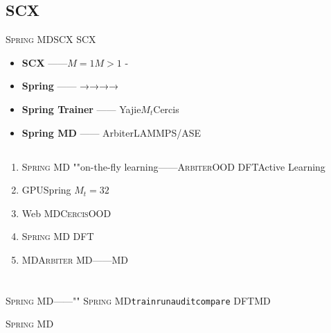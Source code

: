\documentclass[12pt,a4paper]{article}
\theoremstyle{remark}
\newcommand{\Cercis}{\textsc{Cercis}}
\newcommand{\Arbiter}{\textsc{Arbiter}}
\newcommand{\SpringMD}{\textsc{Spring MD}}
\begin{document}
\subsection{SCX}

\SpringMD{}SCX\cite{scx_ml_audit,scx_hamiltonian,yajie_protocol,scx_spring_trainer,scx_spring_framework}
SCX

\begin{itemize}[itemsep=3pt]
    \item \textbf{SCX} ——$M=1$$M>1$
    -
    \item \textbf{Spring\cite{scx_spring_framework}} ——
    →→→→
    \item \textbf{Spring Trainer\cite{scx_spring_trainer}} ——
    Yajie$M_t$Cercis
    \item \textbf{Spring MD} ——
    ArbiterLAMMPS/ASE
\end{itemize}

\subsection{}

\begin{enumerate}[label=(\arabic*),itemsep=3pt]
    \item \textbf{} \SpringMD{}
    ""on-the-fly learning——\Arbiter{}OOD
    DFTActive Learning

    \item \textbf{} GPUSpring
    $M_t=32$

    \item \textbf{} Web
    MD\Cercis{}OOD

    \item \textbf{} \SpringMD{}
    DFT

    \item \textbf{} MD\Arbiter{}
    MD——MD
\end{enumerate}

\newpage

\section{}

\SpringMD{}——""
\SpringMD{}\texttt{train}\texttt{run}\texttt{audit}\texttt{compare}
DFTMD

\SpringMD{}
\end{document}
